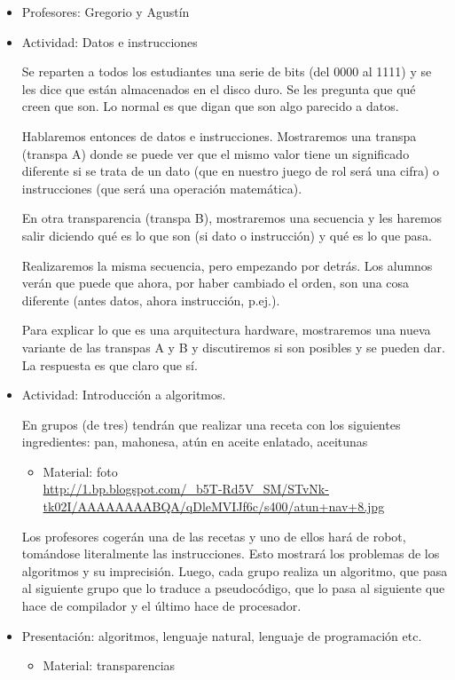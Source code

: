 \documentclass[a4paper,12pt]{article}
\begin{document}
\begin{itemize}
\item Profesores: Gregorio y Agustín
\item Actividad: Datos e instrucciones

  Se reparten a todos los estudiantes una serie de bits (del 0000 al
  1111) y se les dice que están almacenados en el disco duro. Se les
  pregunta que qué creen que son. Lo normal es que digan que son algo
  parecido a datos.

  Hablaremos entonces de datos e instrucciones. Mostraremos una transpa
  (transpa A) donde se puede ver que el mismo valor tiene un significado
  diferente si se trata de un dato (que en nuestro juego de rol será una
  cifra) o instrucciones (que será una operación matemática).

  En otra transparencia (transpa B), mostraremos una secuencia y les
  haremos salir diciendo qué es lo que son (si dato o instrucción) y qué
  es lo que pasa.

  Realizaremos la misma secuencia, pero empezando por detrás. Los alumnos
  verán que puede que ahora, por haber cambiado el orden, son una cosa
  diferente (antes datos, ahora instrucción, p.ej.).

  Para explicar lo que es una arquitectura hardware, mostraremos una nueva
  variante de las transpas A y B y discutiremos si son posibles y se
  pueden dar. La respuesta es que claro que sí.


\item Actividad: Introducción a algoritmos.

  En grupos (de tres) tendrán que realizar una receta con los siguientes
  ingredientes: pan, mahonesa, atún en aceite enlatado, aceitunas

  \begin{itemize}
  \item Material: foto \\
    \url{http://1.bp.blogspot.com/_b5T-Rd5V_SM/STvNk-tk02I/AAAAAAAABQA/qDleMVIJf6c/s400/atun+nav+8.jpg}
  \end{itemize}

  Los profesores cogerán una de las recetas y uno de ellos hará de robot, tomándose literalmente las instrucciones. Esto mostrará los problemas de los algoritmos y su imprecisión.  Luego, cada grupo realiza un algoritmo, que pasa al siguiente grupo que lo traduce a pseudocódigo, que lo pasa al siguiente que hace de compilador y el último hace de procesador.

\item Presentación: algoritmos, lenguaje natural, lenguaje de programación
etc.
  \begin{itemize}
  \item Material: transparencias
  \end{itemize}
\end{itemize}
\end{document}
